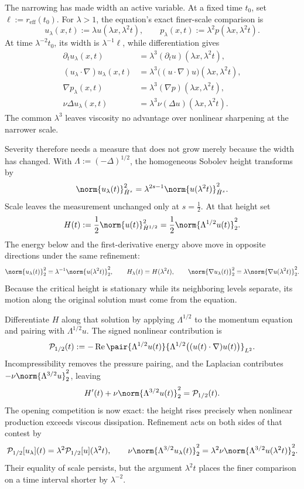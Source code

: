 
The narrowing has made width an active variable.
At a fixed time \(t_0\), set \(\ell:=r_{\mathrm{eff}}(t_0)\).
For \(\lambda>1\), the equation's exact finer-scale comparison is
\[
  u_\lambda(x,t)
  :=
  \lambda u(\lambda x,\lambda^2t),
  \qquad
  p_\lambda(x,t)
  :=
  \lambda^2p(\lambda x,\lambda^2t).
\]
At time \(\lambda^{-2}t_0\), its width is \(\lambda^{-1}\ell\), while differentiation gives
\[
\begin{aligned}
  \partial_tu_\lambda(x,t)
  &=
  \lambda^3(\partial_tu)(\lambda x,\lambda^2t),
  \\
  (u_\lambda\cdot\nabla)u_\lambda(x,t)
  &=
  \lambda^3\bigl((u\cdot\nabla)u\bigr)(\lambda x,\lambda^2t),
  \\
  \nabla p_\lambda(x,t)
  &=
  \lambda^3(\nabla p)(\lambda x,\lambda^2t),
  \\
  \nu\Delta u_\lambda(x,t)
  &=
  \lambda^3\nu(\Delta u)(\lambda x,\lambda^2t).
\end{aligned}
\]
The common \(\lambda^3\) leaves viscosity no advantage over nonlinear sharpening at the narrower scale.


Severity therefore needs a measure that does not grow merely because the width has changed.
With \(\Lambda:=(-\Delta)^{1/2}\), the homogeneous Sobolev height transforms by
\[
  \norm{u_\lambda(t)}_{\dot H^s}^2
  =
  \lambda^{2s-1}
  \norm{u(\lambda^2t)}_{\dot H^s}^2.
\]
Scale leaves the measurement unchanged only at \(s=\tfrac12\).
At that height set
\[
  H(t)
  :=
  \frac12\norm{u(t)}_{\dot H^{1/2}}^2
  =
  \frac12\norm{\Lambda^{1/2}u(t)}_2^2.
\]
The energy below and the first-derivative energy above move in opposite directions under the same refinement:
\[
  \norm{u_\lambda(t)}_2^2
  =
  \lambda^{-1}\norm{u(\lambda^2t)}_2^2,
  \qquad
  H_\lambda(t)=H(\lambda^2t),
  \qquad
  \norm{\nabla u_\lambda(t)}_2^2
  =
  \lambda\norm{\nabla u(\lambda^2t)}_2^2.
\]
Because the critical height is stationary while its neighboring levels separate, its motion along the original solution must come from the equation.


Differentiate \(H\) along that solution by applying \(\Lambda^{1/2}\) to the momentum equation and pairing with \(\Lambda^{1/2}u\).
The signed nonlinear contribution is
\[
  \mathcal P_{1/2}(t)
  :=
  -\operatorname{Re}
  \pair
    {\Lambda^{1/2}u(t)}
    {\Lambda^{1/2}\bigl((u(t)\cdot\nabla)u(t)\bigr)}_{L^2}.
\]
Incompressibility removes the pressure pairing, and the Laplacian contributes \(-\nu\norm{\Lambda^{3/2}u}_2^2\), leaving
\[
  H'(t)
  +
  \nu\norm{\Lambda^{3/2}u(t)}_2^2
  =
  \mathcal P_{1/2}(t).
\]
The opening competition is now exact: the height rises precisely when nonlinear production exceeds viscous dissipation.
Refinement acts on both sides of that contest by
\[
  \mathcal P_{1/2}[u_\lambda](t)
  =
  \lambda^2\mathcal P_{1/2}[u](\lambda^2t),
  \qquad
  \nu\norm{\Lambda^{3/2}u_\lambda(t)}_2^2
  =
  \lambda^2\nu\norm{\Lambda^{3/2}u(\lambda^2t)}_2^2.
\]
Their equality of scale persists, but the argument \(\lambda^2t\) places the finer comparison on a time interval shorter by \(\lambda^{-2}\).

